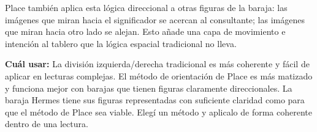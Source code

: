 Place también aplica esta lógica direccional a otras figuras de la baraja: las imágenes que miran hacia el significador se acercan al consultante; las imágenes que miran hacia otro lado se alejan. Esto añade una capa de movimiento e intención al tablero que la lógica espacial tradicional no lleva.

\textbf{Cuál usar:} La división izquierda/derecha tradicional es más coherente y fácil de aplicar en lecturas complejas. El método de orientación de Place es más matizado y funciona mejor con barajas que tienen figuras claramente direccionales. La baraja Hermes tiene sus figuras representadas con suficiente claridad como para que el método de Place sea viable. Elegí un método y aplicalo de forma coherente dentro de una lectura.
